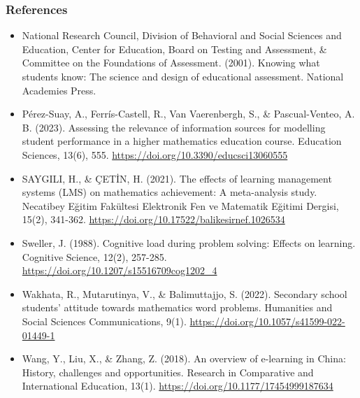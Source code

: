 \documentclass{beamer}
\begin{document}
\begin{frame}
  \frametitle{References}
  \begin{multicols}{2}
      \footnotesize{
      \begin{itemize}
          \item National Research Council, Division of Behavioral and Social Sciences and Education, Center for Education, Board on Testing and Assessment, \& Committee on the Foundations of Assessment. (2001). Knowing what students know: The science and design of educational assessment. National Academies Press.
          \item Pérez-Suay, A., Ferrís-Castell, R., Van Vaerenbergh, S., \& Pascual-Venteo, A. B. (2023). Assessing the relevance of information sources for modelling student performance in a higher mathematics education course. Education Sciences, 13(6), 555. \url{https://doi.org/10.3390/educsci13060555}
          \item SAYGILI, H., \& ÇETİN, H. (2021). The effects of learning management systems (LMS) on mathematics achievement: A meta-analysis study. Necatibey Eğitim Fakültesi Elektronik Fen ve Matematik Eğitimi Dergisi, 15(2), 341-362. \url{https://doi.org/10.17522/balikesirnef.1026534}
          \item Sweller, J. (1988). Cognitive load during problem solving: Effects on learning. Cognitive Science, 12(2), 257-285. \url{https://doi.org/10.1207/s15516709cog1202_4}
          \item Wakhata, R., Mutarutinya, V., \& Balimuttajjo, S. (2022). Secondary school students’ attitude towards mathematics word problems. Humanities and Social Sciences Communications, 9(1). \url{https://doi.org/10.1057/s41599-022-01449-1}
          \item Wang, Y., Liu, X., \& Zhang, Z. (2018). An overview of e-learning in China: History, challenges and opportunities. Research in Comparative and International Education, 13(1). \url{https://doi.org/10.1177/17454999187634}
      \end{itemize}
      }
  \end{multicols}
\end{frame}
\end{document}
